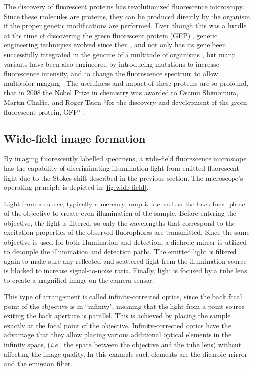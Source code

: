     The discovery of fluorescent proteins has revolutionized fluorescence microscopy. Since these molecules are proteins, they can be produced directly by the organism if the proper genetic modifications are performed. Even though this was a hurdle at the time of discovering the green fluorescent protein (GFP) \cite{shimomura_extraction_1962}, genetic engineering techniques evolved since then \cite{prasher_primary_1992}, and not only has its gene been successfully integrated in the genome of a multitude of organisms \cite{chalfie_green_1994,amsterdam_aequorea_1995,okabe_green_1997}, but many variants have been also engineered by introducing mutations to increase fluorescence intensity, and to change the fluorescence spectrum to allow multicolor imaging \cite{heim_wavelength_1994,heim_engineering_1996,cormack_facs-optimized_1996,okabe_green_1997}. The usefulness and impact of these proteins are so profound, that in 2008 the Nobel Prize in chemistry was awarded to Osamu Shimomura, Martin Chalfie, and Roger Tsien ``for the discovery and development of the green fluorescent protein, GFP" \cite{service_three_2008}.


  \subsection{Wide-field image formation}
    By imaging fluorescently labelled specimens, a wide-field fluorescence microscope has the capability of discriminating illumination light from emitted fluorescent light due to the Stokes shift described in the previous section. The microscope's operating principle is depicted in \autoref{fig:wide-field}.

    Light from a source, typically a mercury lamp is focused on the back focal plane of the objective to create even illumination of the sample. Before entering the objective, the light is filtered, so only the wavelengths that correspond to the excitation properties of the observed fluorophores are transmitted. Since the same objective is used for both illumination and detection, a dichroic mirror is utilized to decouple the illumination and detection paths. The emitted light is filtered again to make sure any reflected and scattered light from the illumination source is blocked to increase signal-to-noise ratio.
    Finally, light is focused by a tube lens to create a magnified image on the camera sensor.
    
    This type of arrangement is called infinity-corrected optics, since the back focal point of the objective is in ``infinity", meaning that the light from a point source exiting the back aperture is parallel. This is achieved by placing the sample exactly at the focal point of the objective. Infinity-corrected optics have the advantage that they allow placing various additional optical elements in the infinity space, (\textit{i.e.}, the space between the objective and the tube lens) without affecting the image quality. In this example such elements are the dichroic mirror and the emission filter. 

